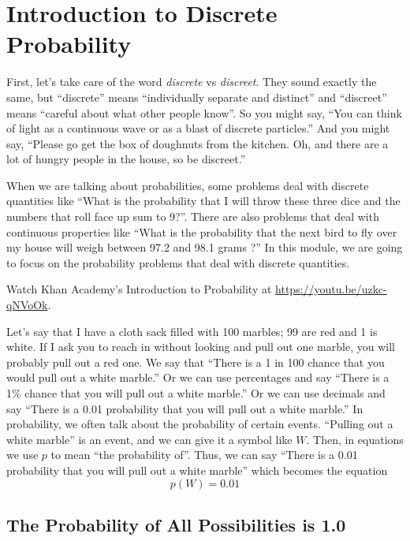 \chapter{Introduction to Discrete Probability}

First, let's take care of the word \emph{discrete} vs \emph{discreet}.
They sound exactly the same, but ``discrete'' means ``individually
separate and distinct'' and ``discreet'' means ``careful about what
other people know''.  So you might say, ``You can think of light as a
continuous wave or as a blast of discrete particles.'' And you might
say, ``Please go get the box of doughnuts from the kitchen. Oh, and
there are a lot of hungry people in the house, so be
discreet.''

When we are talking about probabilities, some problems deal
with discrete quantities like ``What is the probability that I will
throw these three dice and the numbers that roll face up sum to 9?''. There
are also problems that deal with continuous properties like ``What is
the probability that the next bird to fly over my house will weigh
between 97.2 and 98.1 grams ?'' In this module, we are going to focus
on the probability problems that deal with discrete quantities.

Watch Khan Academy's Introduction to Probability at \url{https://youtu.be/uzkc-qNVoOk}.

Let's say that I have a cloth sack filled with 100 marbles; 99 are red
and 1 is white. If I ask you to reach in without looking and pull out
one marble, you will probably pull out a red one. We say that ``There
is a 1 in 100 chance that you would pull out a white marble.'' Or we
can use percentages and say ``There is a 1\% chance that you will pull
out a white marble.'' Or we can use decimals and say ``There is a 0.01
probability that you will pull out a white marble.''
In probability, we often talk about the probability of certain
events. ``Pulling out a white marble'' is an event, and we can give it
a symbol like $W$. Then, in equations we use $p$ to mean ``the
probability of''.  Thus, we can say ``There is a 0.01 probability that
you will pull out a white marble'' which becomes the equation
\begin{equation*}
  p(W) = 0.01
\end{equation*}

\section{The Probability of All Possibilities is 1.0}

